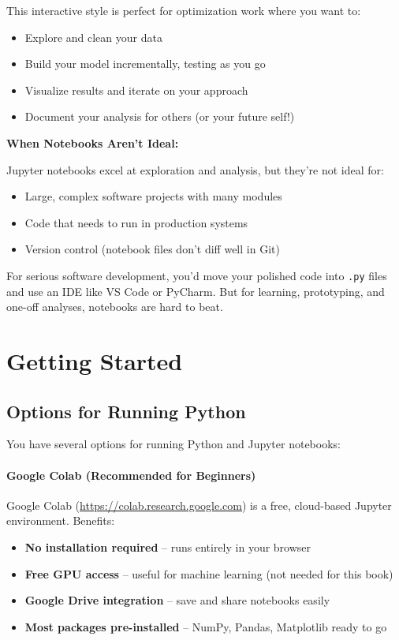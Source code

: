 This interactive style is perfect for optimization work where you want to:
\begin{itemize}
\item Explore and clean your data
\item Build your model incrementally, testing as you go
\item Visualize results and iterate on your approach
\item Document your analysis for others (or your future self!)
\end{itemize}

\begin{warn}
\textbf{When Notebooks Aren't Ideal:}

Jupyter notebooks excel at exploration and analysis, but they're not ideal for:
\begin{itemize}
\item Large, complex software projects with many modules
\item Code that needs to run in production systems
\item Version control (notebook files don't diff well in Git)
\end{itemize}

For serious software development, you'd move your polished code into \texttt{.py} files and use an IDE like VS Code or PyCharm. But for learning, prototyping, and one-off analyses, notebooks are hard to beat.
\end{warn}

\section{Getting Started}

\subsection{Options for Running Python}

You have several options for running Python and Jupyter notebooks:

\paragraph{Google Colab (Recommended for Beginners)}

Google Colab (\url{https://colab.research.google.com}) is a free, cloud-based Jupyter environment. Benefits:
\begin{itemize}
\item \textbf{No installation required} -- runs entirely in your browser
\item \textbf{Free GPU access} -- useful for machine learning (not needed for this book)
\item \textbf{Google Drive integration} -- save and share notebooks easily
\item \textbf{Most packages pre-installed} -- NumPy, Pandas, Matplotlib ready to go
\end{itemize}

